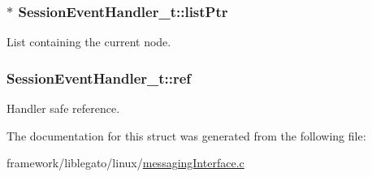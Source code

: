 \subsubsection[{\texorpdfstring{list\+Ptr}{listPtr}}]{$\ast$ Session\+Event\+Handler\+\_\+t\+::list\+Ptr}\hypertarget{struct_session_event_handler__t_aaeed5e90adcba3f9fe6f10af085f2c10}{}\label{struct_session_event_handler__t_aaeed5e90adcba3f9fe6f10af085f2c10}


List containing the current node. 

\subsubsection[{\texorpdfstring{ref}{ref}}]{ Session\+Event\+Handler\+\_\+t\+::ref}\hypertarget{struct_session_event_handler__t_acb78e3740bf80f1c8e1cec9d49994073}{}\label{struct_session_event_handler__t_acb78e3740bf80f1c8e1cec9d49994073}


Handler safe reference. 



The documentation for this struct was generated from the following file\+:\begin{DoxyCompactItemize}
\item 
framework/liblegato/linux/\hyperlink{messaging_interface_8c}{messaging\+Interface.\+c}\end{DoxyCompactItemize}

